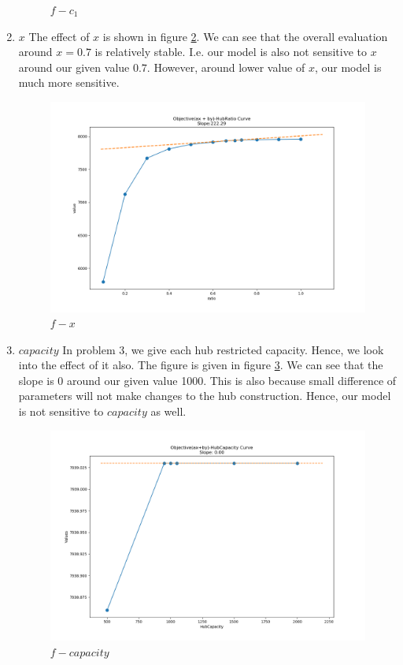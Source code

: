 \documentclass[11pt, a4paper]{article} %
\begin{document}
\begin{enumerate}
\begin{figure}
		\caption{$f-c_1$}
		\label{fig:c1}
	\end{figure}
	\item $x$
	The effect of $x$ is shown in figure \ref{fig:x}. We can see that the overall evaluation around $x=0.7$ is relatively stable. I.e. our model is also not sensitive to $x$ around our given value $0.7$. However, around lower value of $x$, our model is much more sensitive.
	\begin{figure}
		\centering
		\includegraphics[width=\textwidth]{figure/x.png}
		\caption{$f-x$}
		\label{fig:x}
	\end{figure}
	\item $capacity$
	In problem 3, we give each hub restricted capacity.  Hence, we look into the effect of it also. The figure is given in figure \ref{fig:cap}. We can see that the slope is 0 around our given value 1000. This is also because small difference of parameters will not make changes to the hub construction. Hence, our model is not sensitive to $capacity$ as well.
	\begin{figure}
		\centering
		\includegraphics[width=\textwidth]{figure/capacity.png}
		\caption{$f-capacity$}
		\label{fig:cap}
	\end{figure}
\end{enumerate}
\end{document}
